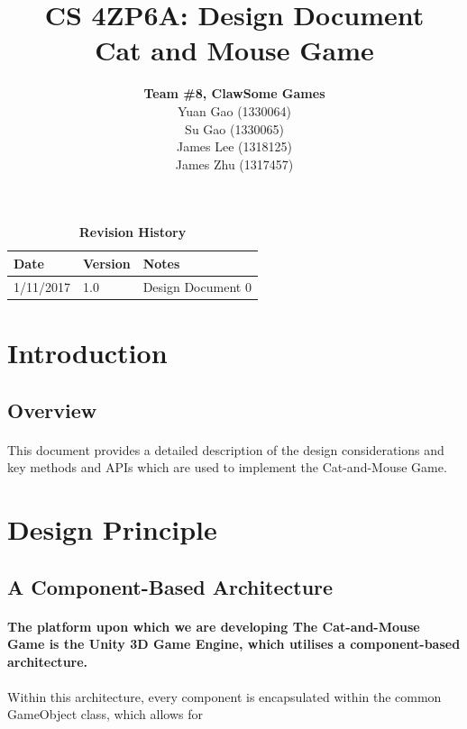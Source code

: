 \documentclass[12pt, titlepage]{article}
\title{CS 4ZP6A: Design Document\\Cat and Mouse Game}
\author{\textbf{Team \#8, ClawSome Games}
		\\ Yuan Gao (1330064)
		\\ Su Gao (1330065)
		\\ James Lee (1318125)
		\\ James Zhu (1317457) 
}
\date{\displaydate{date}}
\begin{document}
\maketitle
{}
\tableofcontents
\listoftables
\listoffigures
\begin{table}[bp]
\caption{\bf Revision History}
\begin{tabularx}{\textwidth}{p{3cm}p{2cm}X}
\toprule {\bf Date} & {\bf Version} & {\bf Notes}\\
\midrule
1/11/2017 & 1.0 & Design Document 0\\
\bottomrule
\end{tabularx}
\end{table}
\newpage


\section{Introduction}

\subsection{Overview}
\paragraph{}This document provides a detailed description of the design considerations and key methods and APIs which are used to implement the Cat-and-Mouse Game.




\section{Design Principle}
\subsection{A Component-Based Architecture}
\paragraph{}\textbf{The platform upon which we are developing The Cat-and-Mouse Game is the Unity 3D Game Engine, which utilises a component-based architecture.}
\paragraph{}Within this architecture, every component is encapsulated within the common GameObject class, which allows for
\end{document}
